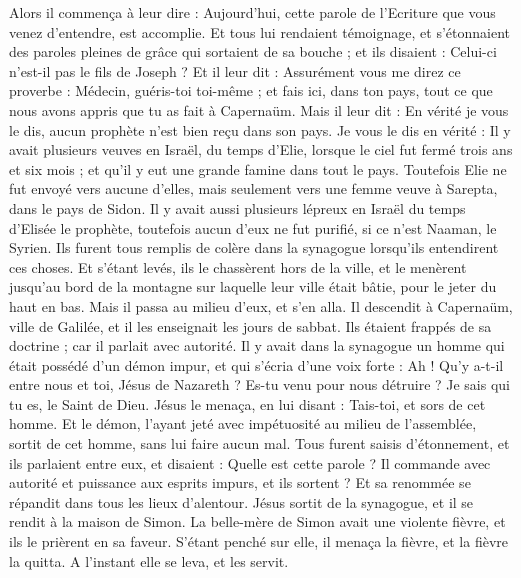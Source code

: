 \begin{multicols}{2}
Alors il commença à leur dire : Aujourd'hui, cette parole de l’Ecriture que vous venez d’entendre, est accomplie.
Et tous lui rendaient témoignage, et s'étonnaient des paroles pleines de grâce qui sortaient de sa bouche ; et ils disaient : Celui-ci n'est-il pas le fils de Joseph ?
Et il leur dit : Assurément vous me direz ce proverbe : Médecin, guéris-toi toi-même ; et fais ici, dans ton pays, tout ce que nous avons appris que tu as fait à Capernaüm.
Mais il leur dit : En vérité je vous le dis, aucun prophète n'est bien reçu dans son pays.
Je vous le dis en vérité : Il y avait plusieurs veuves en Israël, du temps d'Elie, lorsque le ciel fut fermé trois ans et six mois ; et qu'il y eut une grande famine dans tout le pays.
Toutefois Elie ne fut envoyé vers aucune d'elles, mais seulement vers une femme veuve à Sarepta, dans le pays de Sidon.
Il y avait aussi plusieurs lépreux en Israël du temps d'Elisée le prophète, toutefois aucun d'eux ne fut purifié, si ce n’est Naaman, le Syrien.
Ils furent tous remplis de colère dans la synagogue lorsqu’ils entendirent ces choses.
Et s'étant levés, ils le chassèrent hors de la ville, et le menèrent jusqu'au bord de la montagne sur laquelle leur ville était bâtie, pour le jeter du haut en bas.
Mais il passa au milieu d'eux, et s'en alla.
Il descendit à Capernaüm, ville de Galilée, et il les enseignait les jours de sabbat.
Ils étaient frappés de sa doctrine ; car il parlait avec autorité.
Il y avait dans la synagogue un homme qui était possédé d'un démon impur, et qui s'écria d’une voix forte :
Ah ! Qu’y a-t-il entre nous et toi, Jésus de Nazareth ? Es-tu venu pour nous détruire ? Je sais qui tu es, le Saint de Dieu.
Jésus le menaça, en lui disant : Tais-toi, et sors de cet homme. Et le démon, l’ayant jeté avec impétuosité au milieu de l'assemblée, sortit de cet homme, sans lui faire aucun mal.
Tous furent saisis d'étonnement, et ils parlaient entre eux, et disaient : Quelle est cette parole ? Il commande avec autorité et puissance aux esprits impurs, et ils sortent ?
Et sa renommée se répandit dans tous les lieux d'alentour.
Jésus sortit de la synagogue, et il se rendit à la maison de Simon. La belle-mère de Simon avait une violente fièvre, et ils le prièrent en sa faveur.
S'étant penché sur elle, il menaça la fièvre, et la fièvre la quitta. A l’instant elle se leva, et les servit.

\end{multicols}
